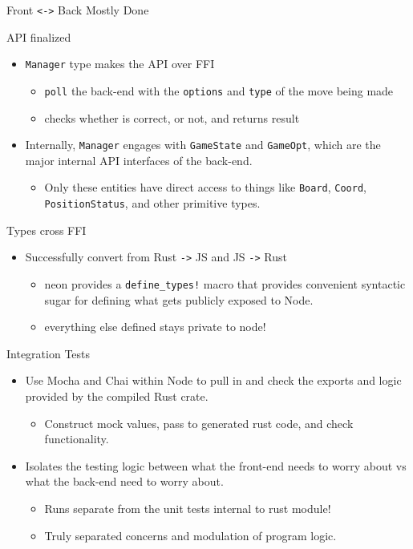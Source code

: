 \documentclass[allowframebreaks]{beamer}
\begin{document}
\begin{frame}[fragile,allowframebreaks, label=]{Front \texttt{<->} Back Mostly Done}
 \begin{block}{API finalized}
\begin{itemize}
\item \texttt{Manager} type makes the API over FFI
\begin{itemize}
\item \texttt{poll} the back-end with the \texttt{options} and \texttt{type} of the move being made
\item checks whether is correct, or not, and returns result
\end{itemize}
\item Internally, \texttt{Manager} engages with \texttt{GameState} and \texttt{GameOpt}, which are the major \alert{internal} API
interfaces of the back-end.
\begin{itemize}
\item Only these entities have direct access to things like \texttt{Board}, \texttt{Coord}, \texttt{PositionStatus}, and
other primitive types.
\end{itemize}
\end{itemize}
\end{block}
\begin{block}{Types cross FFI}
\begin{itemize}
\item Successfully convert from Rust \texttt{->} JS and JS \texttt{->} Rust
\begin{itemize}
\item neon provides a \texttt{define\_types!} macro that provides convenient syntactic sugar for defining
what gets publicly exposed to Node.
\item \alert{everything else defined stays private to node!}
\end{itemize}
\end{itemize}
\end{block}
\begin{block}{Integration Tests}
\begin{itemize}
\item Use Mocha and Chai within Node to pull in and check the exports and logic provided by the
compiled Rust crate.
\begin{itemize}
\item Construct mock values, pass to generated rust code, and check functionality.
\end{itemize}
\item \alert{Isolates the testing logic} between what the front-end needs to worry about vs what the
back-end need to worry about.
\begin{itemize}
\item Runs separate from the unit tests internal to rust module!
\item Truly separated concerns and modulation of program logic.
\end{itemize}
\end{itemize}
\end{block}
\end{frame}
\end{document}
